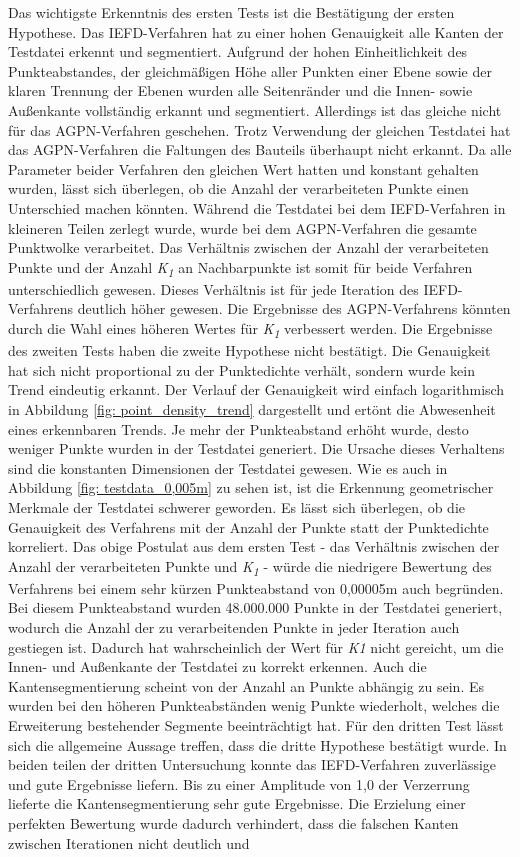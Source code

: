 Das wichtigste Erkenntnis des ersten Tests ist die Bestätigung der ersten Hypothese. Das IEFD-Verfahren hat zu einer hohen Genauigkeit alle Kanten der Testdatei erkennt und segmentiert. Aufgrund der hohen Einheitlichkeit des Punkteabstandes, der gleichmäßigen Höhe aller Punkten einer Ebene sowie der klaren Trennung der Ebenen wurden alle Seitenränder und die Innen- sowie Außenkante vollständig erkannt und segmentiert. Allerdings ist das gleiche nicht für das AGPN-Verfahren geschehen. Trotz Verwendung der gleichen Testdatei hat das AGPN-Verfahren die Faltungen des Bauteils überhaupt nicht erkannt. Da alle Parameter beider Verfahren den gleichen Wert hatten und konstant gehalten wurden, lässt sich überlegen, ob die Anzahl der verarbeiteten Punkte einen Unterschied machen könnten. Während die Testdatei bei dem IEFD-Verfahren in kleineren Teilen zerlegt wurde, wurde bei dem AGPN-Verfahren die gesamte Punktwolke verarbeitet. Das Verhältnis zwischen der Anzahl der verarbeiteten Punkte und der Anzahl \textit{K\textsubscript{1}} an Nachbarpunkte ist somit für beide Verfahren unterschiedlich gewesen. Dieses Verhältnis ist für jede Iteration des IEFD-Verfahrens deutlich höher gewesen. Die Ergebnisse des AGPN-Verfahrens könnten durch die Wahl eines höheren Wertes für \textit{K\textsubscript{1}} verbessert werden. Die Ergebnisse des zweiten Tests haben die zweite Hypothese nicht bestätigt. Die Genauigkeit hat sich nicht proportional zu der Punktedichte verhält, sondern wurde kein Trend eindeutig erkannt. Der Verlauf der Genauigkeit wird einfach logarithmisch in Abbildung \ref{fig: point_density_trend} dargestellt und ertönt die Abwesenheit eines erkennbaren Trends. Je mehr der Punkteabstand erhöht wurde, desto weniger Punkte wurden in der Testdatei generiert. Die Ursache dieses Verhaltens sind die konstanten Dimensionen der Testdatei gewesen. Wie es auch in Abbildung \ref{fig: testdata_0,005m} zu sehen ist, ist die Erkennung geometrischer Merkmale der Testdatei schwerer geworden. Es lässt sich überlegen, ob die Genauigkeit des Verfahrens mit der Anzahl der Punkte statt der Punktedichte korreliert. Das obige Postulat aus dem ersten Test - das Verhältnis zwischen der Anzahl der verarbeiteten Punkte und \textit{K\textsubscript{1}} - würde die niedrigere Bewertung des Verfahrens bei einem sehr kürzen Punkteabstand von 0,00005m auch begründen. Bei diesem Punkteabstand wurden 48.000.000 Punkte in der Testdatei generiert, wodurch die Anzahl der zu verarbeitenden Punkte in jeder Iteration auch gestiegen ist. Dadurch hat wahrscheinlich der Wert für \textit{K\textit{1}} nicht gereicht, um die Innen- und Außenkante der Testdatei zu korrekt erkennen. Auch die Kantensegmentierung scheint von der Anzahl an Punkte abhängig zu sein. Es wurden bei den höheren Punkteabständen wenig Punkte wiederholt, welches die Erweiterung bestehender Segmente beeinträchtigt hat. Für den dritten Test lässt sich die allgemeine Aussage treffen, dass die dritte Hypothese bestätigt wurde. In beiden teilen der dritten Untersuchung konnte das IEFD-Verfahren zuverlässige und gute Ergebnisse liefern. Bis zu einer Amplitude von 1,0 der Verzerrung lieferte die Kantensegmentierung sehr gute Ergebnisse. Die Erzielung einer perfekten Bewertung wurde dadurch verhindert, dass die falschen Kanten zwischen Iterationen nicht deutlich und 